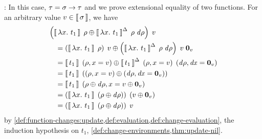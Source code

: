 \begin{optionalproof}
  \Case {}: In this case, $\Gt = \Fun{\Gs}{\Gt}$
  and we prove extensional equality of two functions. For an
  arbitrary value $v \in \Eval{\Gs}$, we have
  \begin{align*}
    &         \App
                {\Apply*
                  {\EvalIncWith{\Lam{x}{t_1}}{\Gr}{\D \Gr}}
                  {\EvalWith{\Lam{x}{t_1}}{\Gr}}}
                {v}\\
    & \quad = \Apply
                {\App
                  {\App
                    {\EvalIncWith*{\Lam{x}{t_1}}{\Gr}{\D \Gr}}
                    {v}}
                  {\NilC[\Gt _1]{v}}}
                {\App
                  {\EvalWith*{\Lam{x}{t_1}}{\Gr}}
                  {v}}\\
    & \quad = \Apply
                {\EvalIncWith
                  {t_1}
                  {\ExtendEnv*[\Gr]{x}{v}}
                  {\ExtendEnv*[\D \Gr]{\D x}{\NilC{v}}}}
                {\EvalWith
                  {t_1}
                  {\ExtendEnv*[\Gr]{x}{v}}}\\
    & \quad = \EvalWith
                {t_1}
                {\Apply*
                  {\ExtendEnv*[\D \Gr]{\D x}{\NilC{v}}}
                  {\ExtendEnv*[\Gr]{x}{v}}}\\
    & \quad = \EvalWith
                {t_1}
                {\ExtendEnv*
                  [\Apply{\D \Gr}{\Gr}]
                  {x}
                  {\Apply{\NilC{v}}{v}}}\\
    & \quad = \App
                {\EvalWith*
                  {\Lam{x}{t_1}}
                  {\Apply*{\D \Gr}{\Gr}}}
                {\Apply*{\NilC{v}}{v}}\\
    & \quad = \App
                {\EvalWith*
                  {\Lam{x}{t_1}}
                  {\Apply*{\D \Gr}{\Gr}}}
                {v}
  \end{align*}
  by
  \cref{def:function-changes:update,def:evaluation,def:change-evaluation},
  the induction hypothesis on $t_1$,
  \cref{def:change-environments,thm:update-nil}.


\end{optionalproof}
